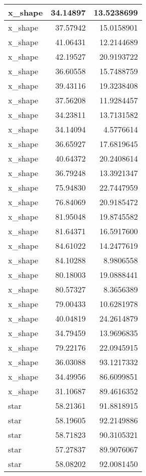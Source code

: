 \documentclass[
]{book}
\theoremstyle{definition}
\theoremstyle{definition}
\theoremstyle{definition}
\theoremstyle{definition}
\theoremstyle{remark}
\begin{document}
\begin{tabular}{l|r|r}
\hline
x\_shape & 34.14897 & 13.5238699\\
\hline
x\_shape & 37.57942 & 15.0158901\\
\hline
x\_shape & 41.06431 & 12.2144689\\
\hline
x\_shape & 42.19527 & 20.9193722\\
\hline
x\_shape & 36.60558 & 15.7488759\\
\hline
x\_shape & 39.43116 & 19.3238408\\
\hline
x\_shape & 37.56208 & 11.9284457\\
\hline
x\_shape & 34.23811 & 13.7131582\\
\hline
x\_shape & 34.14094 & 4.5776614\\
\hline
x\_shape & 36.65927 & 17.6819645\\
\hline
x\_shape & 40.64372 & 20.2408614\\
\hline
x\_shape & 36.79248 & 13.3921347\\
\hline
x\_shape & 75.94830 & 22.7447959\\
\hline
x\_shape & 76.84069 & 20.9185472\\
\hline
x\_shape & 81.95048 & 19.8745582\\
\hline
x\_shape & 81.64371 & 16.5917600\\
\hline
x\_shape & 84.61022 & 14.2477619\\
\hline
x\_shape & 84.10288 & 8.9806558\\
\hline
x\_shape & 80.18003 & 19.0888441\\
\hline
x\_shape & 80.57327 & 8.3656389\\
\hline
x\_shape & 79.00433 & 10.6281978\\
\hline
x\_shape & 40.04819 & 24.2614879\\
\hline
x\_shape & 34.79459 & 13.9696835\\
\hline
x\_shape & 79.22176 & 22.0945915\\
\hline
x\_shape & 36.03088 & 93.1217332\\
\hline
x\_shape & 34.49956 & 86.6099851\\
\hline
x\_shape & 31.10687 & 89.4616352\\
\hline
star & 58.21361 & 91.8818915\\
\hline
star & 58.19605 & 92.2149886\\
\hline
star & 58.71823 & 90.3105321\\
\hline
star & 57.27837 & 89.9076067\\
\hline
star & 58.08202 & 92.0081450\\

\end{tabular}
\end{document}
